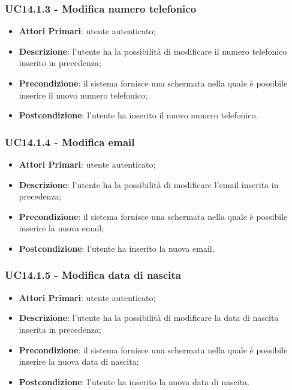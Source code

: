 \subsubsection{UC14.1.3 - Modifica numero telefonico}
\begin{itemize}
	\item \textbf{Attori Primari}: utente autenticato;
	\item \textbf{Descrizione}: l'utente ha la possibilità di modificare il numero telefonico inserito in precedenza;
	\item \textbf{Precondizione}: il sistema fornisce una schermata nella quale è possibile inserire il nuovo numero telefonico;
	\item \textbf{Postcondizione}: l'utente ha inserito il nuovo numero telefonico.
\end{itemize}

\subsubsection{UC14.1.4 - Modifica email}
\begin{itemize}
	\item \textbf{Attori Primari}: utente autenticato;
	\item \textbf{Descrizione}: l'utente ha la possibilità di modificare l'email inserita in precedenza;
	\item \textbf{Precondizione}: il sistema fornisce una schermata nella quale è possibile inserire la nuova email;
	\item \textbf{Postcondizione}: l'utente ha inserito la nuova email.
\end{itemize}

\subsubsection{UC14.1.5 - Modifica data di nascita}
\begin{itemize}
	\item \textbf{Attori Primari}: utente autenticato;
	\item \textbf{Descrizione}: l'utente ha la possibilità di modificare la data di nascita inserita in precedenza;
	\item \textbf{Precondizione}: il sistema fornisce una schermata nella quale è possibile inserire la nuova data di nascita;
	\item \textbf{Postcondizione}: l'utente ha inserito la nuova data di nascita.
\end{itemize}

